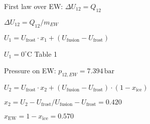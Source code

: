 First law over EW:  
\( \Delta U_{12} = Q_{12} \)  

\( \Delta U_{12} = Q_{12} / m_{EW} \)  

\( U_1 = U_{\text{frost}} \cdot x_1 + (U_{\text{fusion}} - U_{\text{frost}}) \)  

\( U_1 = 0^\circ \text{C} \)  
Table 1  

Pressure on EW:  
\( p_{12,EW} = 7.394 \, \text{bar} \)  

\( U_2 = U_{\text{frost}} \cdot x_2 + (U_{\text{fusion}} - U_{\text{frost}}) \cdot (1 - x_{\text{ice}}) \)  

\( x_2 = U_2 - U_{\text{frost}} / U_{\text{fusion}} - U_{\text{frost}} = 0.420 \)  

\( x_{\text{EW}} = 1 - x_{\text{ice}} = 0.570 \)